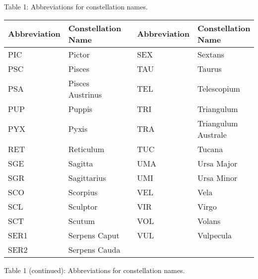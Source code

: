 \begin{table}
\begin{center}
Table 1: Abbreviations for constellation names.
\end{center}

\end{table}

\begin{table}

\begin{tabular}{|l|l|l|l|l|}\hline
Abbreviation  &  Constellation Name & &  Abbreviation  &  Constellation Name \\ \hline

PIC  &  Pictor         & &  SEX  &  Sextans  \\
PSC  &  Pisces         & &  TAU  &  Taurus  \\
PSA  &  Pisces Austrinus & &  TEL  &  Telescopium  \\
PUP  &  Puppis         & &  TRI  &  Triangulum  \\
PYX  &  Pyxis          & &  TRA  &  Triangulum Australe  \\
RET  &  Reticulum      & &  TUC  &  Tucana  \\
SGE  &  Sagitta        & &  UMA  &  Ursa Major  \\
SGR  &  Sagittarius    & &  UMI  &  Ursa Minor  \\
SCO  &  Scorpius       & &  VEL  &  Vela  \\
SCL  &  Sculptor       & &  VIR  &  Virgo  \\
SCT  &  Scutum         & &  VOL  &  Volans  \\
SER1 &  Serpens Caput  & &  VUL  &  Vulpecula  \\
SER2 &  Serpens Cauda  & &  & \\ \hline
\end{tabular}

\begin{center}
Table 1 (continued): Abbreviations for constellation names.
\end{center}

\end{table}

%
%

